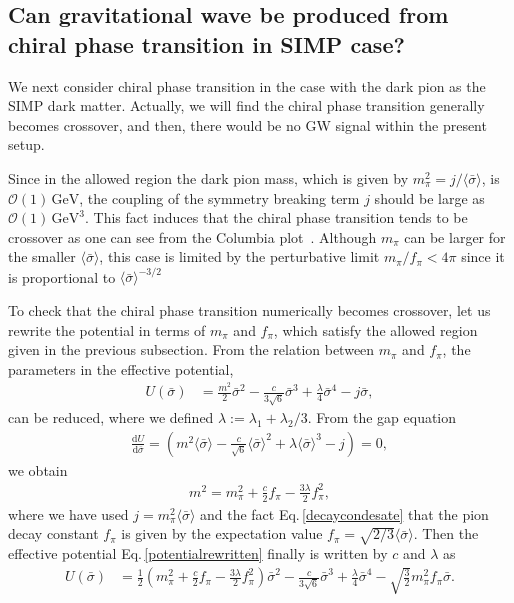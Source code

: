\documentclass[a4paper,preprint,superscriptaddress,preprintnumbers,nofootinbib]{revtex4}
\newcommand{\al}[1]{\begin{align}#1\end{align}}
\newcommand{\df}{\text{d}}
\newcommand{\fn}[1]{\!\left(#1\right)}
\newcommand{\bra}{\langle}
\newcommand{\ket}{\rangle}
\begin{document}
\subsection{Can gravitational wave be produced from chiral phase transition in SIMP case?}
We next consider chiral phase transition in the case with the dark pion as the SIMP dark matter.
Actually, we will find the chiral phase transition generally becomes crossover,
 and then, there would be no GW signal within the present setup.

Since in the allowed region the dark pion mass,
 which is given by $m_\pi^2=j/\bra \bar \sigma\ket$,
 is $\mathcal O\fn{1}\, \text{GeV}$,
 the coupling of the symmetry breaking term $j$ should be large as $\mathcal O\fn{1}\, \text{GeV}^3$.
This fact induces that the chiral phase transition tends to be crossover as one can see from the Columbia plot~\cite{Brown:1990ev}.
Although $m_\pi$ can be larger for the smaller $\bra \bar \sigma\ket$, this case is limited by the perturbative limit $m_\pi/f_\pi<4\pi$ since it is proportional to $\bra \bar \sigma\ket^{-3/2}$

To check that the chiral phase transition numerically becomes crossover,
 let us rewrite the potential in terms of $m_\pi$ and $f_\pi$,
 which satisfy the allowed region given in the previous subsection.
From the relation between $m_\pi$ and $f_\pi$, the parameters in the effective potential,
\al{
U\fn{\bar \sigma}&=\frac{m^2}{2}{\bar \sigma}^2-\frac{c}{3\sqrt{6}}{\bar \sigma}^3+\frac{\lambda}{4}{\bar \sigma}^4-j{\bar \sigma},
\label{potentialrewritten}
}
can be reduced, where we defined $\lambda:=\lambda_1+\lambda_2/3$.
From the gap equation 
\al{
\frac{\df U}{\df {\bar \sigma}}
=\left(m^2\bra{\bar \sigma}\ket-\frac{c}{\sqrt{6}}\bra{\bar \sigma}\ket^2+\lambda\bra{\bar \sigma}\ket^3-j\right)=0,
\label{mpifpirelation}
}
we obtain 
\al{
m^2=m_\pi^2+\frac{c}{2}f_\pi-\frac{3\lambda}{2}f_\pi^2,
}
where we have used $j=m_\pi^2\bra\bar \sigma\ket$ and the fact Eq.\,\eqref{decaycondesate} that the pion decay constant $f_\pi$ is given by the expectation value $f_\pi=\sqrt{2/3}\bra \bar \sigma\ket $.
Then the effective potential Eq.\,\eqref{potentialrewritten} finally is written by $c$ and $\lambda$ as
\al{
U\fn{\bar \sigma}&=
\frac{1}{2}\left(m_\pi^2+\frac{c}{2}f_\pi-\frac{3\lambda}{2}f_\pi^2\right){\bar \sigma}^2
-\frac{c}{3\sqrt{6}}{\bar \sigma}^3+\frac{\lambda}{4}{\bar \sigma}^4 - \sqrt{\frac{3}{2}}m_\pi^2f_\pi {\bar \sigma}.
}
\end{document}
